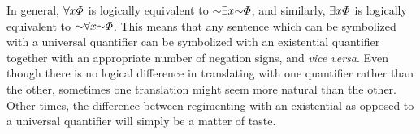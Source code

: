 %
%
%

In general, $\forall x \varPhi$ is logically equivalent to $\enot\qt{\exists}{x}\enot\metaA$, and similarly, $\exists x \varPhi$ is logically equivalent to $\enot\qt{\forall}{x}\enot\metaA$.
This means that any sentence which can be symbolized with a universal quantifier can be symbolized with an existential quantifier together with an appropriate number of negation signs, and \textit{vice versa}.
Even though there is no logical difference in translating with one quantifier rather than the other, sometimes one translation might seem more natural than the other.
Other times, the difference between regimenting with an existential as opposed to a universal quantifier will simply be a matter of taste.

